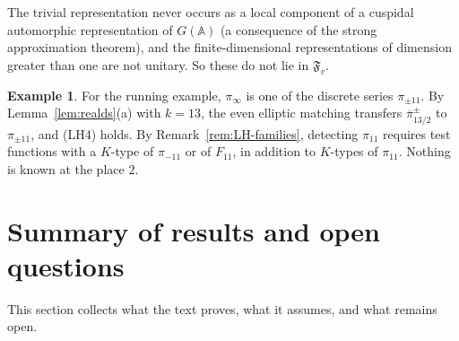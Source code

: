 \documentclass[12pt,letterpaper,openany]{book}
\theoremstyle{plain}
\theoremstyle{definition}
\newtheorem{example}[theorem]{Example}
\theoremstyle{remark}
\theoremstyle{remark}
\begin{document}
The trivial representation never occurs as a local component of a
cuspidal automorphic representation of $G({\mathbb{A}})$ (a consequence of
the strong approximation theorem), and the finite-dimensional
representations of dimension greater than one are not unitary. So these
do not lie in $\mathfrak{F}_v$.

\begin{example}
For the running example, $\pi_\infty$ is one of the discrete series
$\pi_{\pm11}$. By Lemma~\ref{lem:realds}(a) with $k=13$, the even elliptic
matching transfers $\overline\pi{}^{\pm}_{13/2}$ to $\pi_{\pm11}$, and (LH4)
holds. By Remark~\ref{rem:LH-families}, detecting $\pi_{11}$ requires
test functions with a $K$-type of $\pi_{-11}$ or of $F_{11}$, in addition
to $K$-types of $\pi_{11}$. Nothing is known at the place $2$.
\end{example}

\section{Summary of results and open questions}\label{sec:summary}

This section collects what the text proves, what it assumes, and what
remains open.
\end{document}
